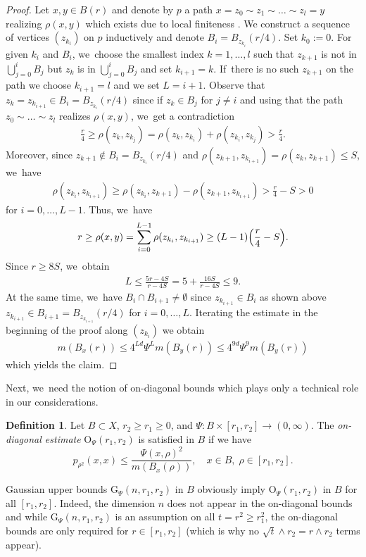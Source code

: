 \documentclass[JEP,XML,SOM,Unicode,published]{cedram}
\newcommand{\rG}{\mathrm{G}}
\newcommand{\rO}{\mathrm{O}}
\theoremstyle{plain}
\theoremstyle{definition}
\newtheorem{definition}[theorem]{Definition}
\begin{document}
\begin{proof}
Let $x,y\in B(r)$ and
denote by $p$ a path $x=z_0\sim z_1\sim \ldots \sim z_l= y$ realizing $\rho(x,y)$ which exists due to local finiteness \cf \cite[Ch.\,12.2]{KellerLW-21}. We construct a sequence of vertices $ (z_{k_i}) $ on $ p $ inductively and denote $ B_{i}=B_{z_{k_{i}}}(r/4) $. Set $k_0:=0$. For given $ k_{i} $ and $ B_{i} $, we~choose the smallest index $ k =1,\ldots,l$ such that $ z_{k+1} $ is not in $\bigcup_{j=0}^{i} B_{j} $ but $ z_{k} $ is in $\bigcup_{j=0}^{i} B_{j} $ and set $ k_{i+1}={k} $. If~there is no such $ z_{k+1} $ on the path we choose $ k_{i+1}=l $ and we set $ L=i+1 $. {Observe that $ z_{k}=z_{k_{i+1}}\in B_{i}=B_{z_{k_{i}}}(r/4) $ since if $ z_{k}\in B_{j} $ for $ j\neq i $ and using that the path $ z_0\sim\ldots\sim z_{l} $ realizes $ \rho(x,y) $, we~get a contradiction
\begin{align*}
\frac{r}{4}\ge \rho(z_{k},z_{k_{j}})= \rho(z_{k},z_{k_{i}})+ \rho(z_{k_{i}},z_{k_{j}})>\frac{r}{4}.
\end{align*}
}Moreover, since $ z_{k+1}\not\in B_{i}= B_{z_{k_{i}}}(r/4) $ and {$ \rho(z_{k+1},z_{k_{i+1}})=\rho(z_{k},z_{k+1})\leq S $, we~have
\begin{align*}
\rho ( z_{k_i}, z_{k_{i+1}})\ge \rho(z_{k_{i}},z_{k+1})-\rho(z_{k+1},z_{k_{i+1}})>\frac{r}{4}-S > 0
\end{align*}}
for $ i=0,\ldots,L-1 $. Thus, we~have
\begin{align*}
r\ge \rho(x,y)=\sum_{i=0}^{L-1}\rho(z_{k_{i}},z_{k_{i+1}}) \ge (L-1)\Bigl(\frac{r}{4}-S\Bigr).
\end{align*}
Since $ r\ge 8S $, we~obtain
\begin{align*}
L\le \frac{5r-4S}{r-4S}= 5 + \frac{16S}{r-4S}\leq 9.
\end{align*}
At the same time, we~have
$ B_{i}\cap B_{i+1} \neq \emptyset$ since {$ z_{k_{i+1}}\in B_{i}$ as shown above $z_{k_{i+1}}\in B_{i+1}=B_{z_{k_{i+1}}}(r/4) $} for $ i=0,\ldots, L $.
Iterating the estimate in the beginning of the proof along $ (z_{k_{i}}) $ we obtain
\begin{align*}
m(B_{x}(r))\leq 4^{Ld}\Psi^{L}m(B_{y}(r))\leq 4^{9d}\Psi^{9}m(B_{y}(r))
\end{align*}
which yields the claim.
\end{proof}

Next, we~need the notion of on-diagonal bounds which plays only a technical role in our considerations.

\begin{definition} Let $B\subset X$, $ r_{2}\ge r_{1}\ge 0 $, and $\Psi\colon B\times [r_1,r_2]\to (0,\infty)$. The \emph{on-diagonal estimate} $\rO_{\Psi}(r_1,r_2)$ is satisfied in $B$ if we have
\[
p_{\rho^2}(x,x)\leq \frac{\Psi(x,\rho)^2}{m(B_x(\rho))},\quad x\in B,\; \rho\in[r_1,r_2].
\]
\end{definition}
Gaussian upper bounds $\rG_\Psi(n,r_1,r_2)$ in $B$ obviously imply $\rO_\Psi(r_1,r_2)$ in $B$ for all $[r_1,r_2]$. Indeed, the dimension $ n $ does not appear in the on-diagonal bounds and while $\rG_\Psi(n,r_1,r_2) $ is an assumption on all $ t=r^{2}\ge r_{1} ^{2}$, the on-diagonal bounds are only required for $ r \in[r_{1},r_{2}]$ (which is why no $ \sqrt{t}\wedge r_{2}=r\wedge r_{2} $ terms appear).
\end{document}
